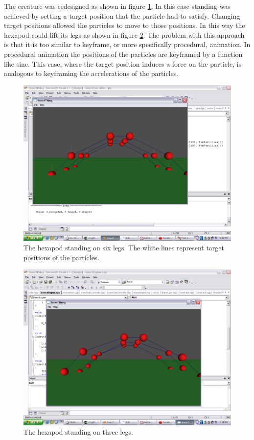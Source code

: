 The creature was redesigned as shown in figure \ref{Fig:InsectThing0}. In this
case standing was achieved by setting a target position that the particle had to
satisfy. Changing target positions allowed the particles to move to those
positions. In this way the hexapod could lift its legs as shown in figure
\ref{Fig:InsectThing1}. The problem with this approach is that it is too similar
to keyframe, or more specifically procedural, animation. In procedural animation
the positions of the particles are keyframed by a function like sine. This
case, where the target position induces a force on the particle, is
analogous to keyframing the accelerations of the particles.
\begin{figure}
    \centering
    \includegraphics[height=0.5\textheight]{InsectThing1}
    \caption{\label{Fig:InsectThing0}The hexapod standing on six legs. The white
    lines represent target positions of the particles.}
\end{figure}
\begin{figure}
\centering
\includegraphics[height=0.5\textheight]{InsectThing0}
\caption{\label{Fig:InsectThing1}The hexapod standing on three legs.}
\end{figure}

